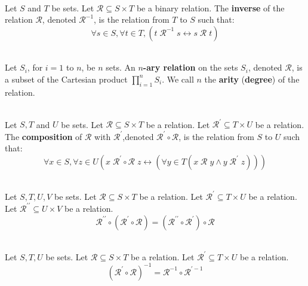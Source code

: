 \documentclass[12pt]{article}
\begin{document}
\begin{definition}[8.2.6]
\hfill\\
\normalfont Let $S$ and $T$ be sets. Let $\mathcal{R}\subseteq S\times T$ be a binary relation. The \textbf{inverse} of the relation $\mathcal{R}$, denoted $\mathcal{R}^{-1}$, is the relation from $T$ to $S$ such that:
\[
\forall s\in S, \forall t\in T, (t\;\mathcal{R}^{-1}\;s\leftrightarrow s\;\mathcal{R}\;t)
\]
\end{definition}
\begin{definition}
\hfill\\
\normalfont Let $S_i$, for $i = 1$ to $n$, be $n$ sets. An \textbf{$n$-ary relation} on the sets $S_i$, denoted $\mathcal{R}$, is a subset of the Cartesian product $\prod^{n}_{i=1}S_i$. We call $n$ the \textbf{arity} (\textbf{degree}) of the relation.
\end{definition}
\begin{definition}
\hfill\\
\normalfont Let $S,T$ and $U$ be sets. Let $\mathcal{R}\subseteq S\times T$ be a relation. Let $\mathcal{R}^\prime\subseteq T\times U$ be a relation. The \textbf{composition} of $\mathcal{R}$ with $\mathcal{R}^\prime$,denoted $\mathcal{R}^\prime\circ \mathcal{R}$, is the relation from $S$ to $U$ such that:
\[
\forall x\in S, \forall z\in U (x\;\mathcal{R}^\prime\circ \mathcal{R}\;z\leftrightarrow(\forall y\in T(x\;\mathcal{R}\;y\land y\;\mathcal{R}^\prime\; z)))
\]
\end{definition}
\begin{proposition}
\hfill\\
\normalfont Let $S, T, U, V$ be sets. Let $\mathcal{R}\subseteq S\times T$ be a relation. Let $\mathcal{R}^\prime \subseteq T\times U$ be a relation. Let $\mathcal{R}^{\prime\prime}\subseteq U\times V$ be a relation.
\[
\mathcal{R}^{\prime\prime}\circ (\mathcal{R}^\prime\circ\mathcal{R}) = (\mathcal{R}^{\prime\prime}\circ \mathcal{R}^\prime)\circ\mathcal{R}
\]
\end{proposition}
\begin{proposition}[8.2.10]
\hfill\\
\normalfont Let $S, T, U$ be sets. Let $\mathcal{R}\subseteq S\times T$ be a relation. Let $\mathcal{R}^\prime \subseteq T\times U$ be a relation.
\[
 (\mathcal{R}^\prime\circ\mathcal{R})^{-1}=\mathcal{R}^{-1}\circ\mathcal{R}^{\prime-1}
\]
\end{proposition}
\end{document}
